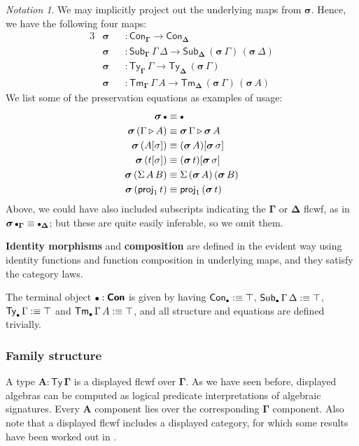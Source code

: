 \documentclass[12pt,a4paper,twoside,openany]{book}
\theoremstyle{remark}
\newtheorem{notation}{Notation}
\theoremstyle{definition}
\theoremstyle{theorem}
\newcommand{\bs}[1]{\boldsymbol{#1}}
\newcommand{\Con}{\mathsf{Con}}
\newcommand{\Sub}{\mathsf{Sub}}
\newcommand{\Tm}{\mathsf{Tm}}
\newcommand{\Ty}{\mathsf{Ty}}
\newcommand{\proj}{\mathsf{proj}}
\newcommand{\ext}{\triangleright}
\newcommand{\emptycon}{\scaleobj{.75}\bullet}
\newcommand{\bCon}{\bs{\Con}}
\newcommand{\bTy}{\bs{\Ty}}
\newcommand{\bGamma}{\bs{\Gamma}}
\newcommand{\bDelta}{\bs{\Delta}}
\newcommand{\bsigma}{\bs{\sigma}}
\newcommand{\bA}{\bs{A}}
\newcommand{\bemptycon}{\scaleobj{.75}{\bs{\bullet}}}
\newcommand{\defn}{:\equiv}
\begin{document}
\begin{notation}
We may implicitly project out the underlying maps from $\bsigma$. Hence, we
have the following four maps:
\begin{alignat*}{3}
  & \bsigma &&: \Con_{\bGamma} \to \Con_{\bDelta} \\
  & \bsigma &&: \Sub_{\bGamma}\,\Gamma\,\Delta \to \Sub_{\bDelta}\,(\bsigma\,\Gamma)\,(\bsigma\,\Delta)\\
  & \bsigma &&: \Ty_{\bGamma}\,\Gamma \to \Ty_{\bDelta}\,(\bsigma\,\Gamma)\\
  & \bsigma &&: \Tm_{\bGamma}\,\Gamma\,A \to \Tm_{\bDelta}\,(\bsigma\,\Gamma)\,(\bsigma\,A)
\end{alignat*}
We list some of the preservation equations as examples of usage:
\begin{alignat*}{3}
  \bsigma\,\emptycon &\equiv \emptycon \\
  \bsigma\,(\Gamma \ext A) &\equiv \bsigma\,\Gamma \ext \bsigma\,A\\
  \bsigma\,(A[\sigma]) &\equiv (\bsigma\,A)[\bsigma\,\sigma]\\
  \bsigma\,(t[\sigma]) &\equiv (\bsigma\,t)[\bsigma\,\sigma]\\
  \bsigma\,(\Sigma\,A\,B) &\equiv \Sigma\,(\bsigma\,A)\,(\bsigma\,B)\\
  \bsigma\,(\proj_1\,t) &\equiv \proj_1\,(\bsigma\,t)
\end{alignat*}
Above, we could have also included subscripts indicating the $\bGamma$ or
$\bDelta$ flcwf, as in $\bsigma\,\emptycon_{\bGamma} \equiv
\emptycon_{\bDelta}$; but these are quite easily inferable, so we omit them.
\end{notation}

\textbf{Identity morphisms} and \textbf{composition} are defined in the evident
way using identity functions and function composition in underlying maps, and
they satisfy the category laws.

The terminal object $\bemptycon:\bCon$ is given by having $\Con_{\bemptycon} \defn
\top$, $\Sub_{\bemptycon}\,\Gamma\,\Delta \defn \top$, $\Ty_{\bemptycon}\,\Gamma \defn \top$ and
$\Tm_{\bemptycon}\,\Gamma\,A \defn \top$, and all structure and equations are defined trivially.

\subsubsection{Family structure}
\label{sec:fqiit-family}

A type $\bA : \bTy\,\bGamma$ is a displayed flcwf over $\bGamma$.  As we have
seen before, displayed algebras can be computed as logical predicate
interpretations of algebraic signatures. Every $\bA$ component lies over the
corresponding $\bGamma$ component. Also note that a displayed flcwf includes a
displayed category, for which some results have been worked out in
\cite{displayedcats}.
\end{document}
